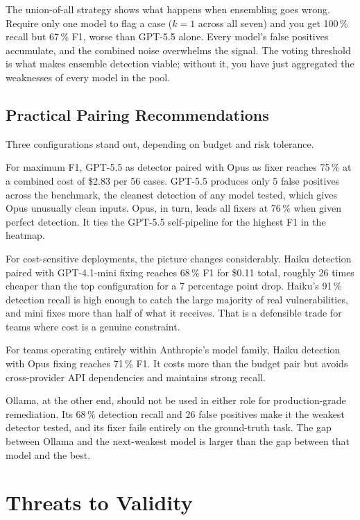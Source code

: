 \documentclass[12pt]{article}
\begin{document}
The union-of-all strategy shows what happens when ensembling goes wrong.
Require only one model to flag a case ($k=1$ across all seven) and you get
100\,\% recall but 67\,\% F1, worse than GPT-5.5 alone. Every model's false
positives accumulate, and the combined noise overwhelms the signal. The voting
threshold is what makes ensemble detection viable; without it, you have just
aggregated the weaknesses of every model in the pool.

\subsection{Practical Pairing Recommendations}

Three configurations stand out, depending on budget and risk tolerance.

For maximum F1, GPT-5.5 as detector paired with Opus as fixer reaches 75\,\%
at a combined cost of \$2.83 per 56 cases. GPT-5.5 produces only 5 false
positives across the benchmark, the cleanest detection of any model tested,
which gives Opus unusually clean inputs. Opus, in turn, leads all fixers at
76\,\% when given perfect detection. It ties the GPT-5.5 self-pipeline for the
highest F1 in the heatmap.

For cost-sensitive deployments, the picture changes considerably. Haiku
detection paired with GPT-4.1-mini fixing reaches 68\,\% F1 for \$0.11 total,
roughly 26 times cheaper than the top configuration for a 7 percentage point
drop. Haiku's 91\,\% detection recall is high enough to catch the large
majority of real vulnerabilities, and mini fixes more than half of what it
receives. That is a defensible trade for teams where cost is a genuine
constraint.

For teams operating entirely within Anthropic's model family, Haiku detection
with Opus fixing reaches 71\,\% F1. It costs more than the budget pair but
avoids cross-provider API dependencies and maintains strong recall.

Ollama, at the other end, should not be used in either role for
production-grade remediation. Its 68\,\% detection recall and 26 false
positives make it the weakest detector tested, and its fixer fails entirely
on the ground-truth task. The gap between Ollama and the next-weakest model
is larger than the gap between that model and the best.

\section{Threats to Validity}
\label{sec:threats}
\end{document}
